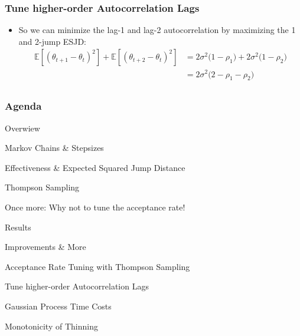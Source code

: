 \begin{frame}[c]
    \frametitle{Tune higher-order Autocorrelation Lags}
    \begin{itemize}
        \item So we can minimize the lag-1 and lag-2 autocorrelation by maximizing the 1 and 2-jump ESJD:
            \begin{align*}
                \mathbb{E}[(\theta_{t+1} - \theta_t)^2] + \mathbb{E}[(\theta_{t+2} - \theta_t)^2] 
                &= 2\sigma^2\big(1 - \rho_1\big) +  2\sigma^2\big(1 - \rho_2\big)\\
                &= 2\sigma^2\big(2 - \rho_1 - \rho_2\big)\\
            \end{align*}
    \end{itemize}
\end{frame}

\begin{frame}[c]
    \frametitle{Agenda}
    \begin{itemize}
        {\color{lgray}
        \item Overwiew
        }
        \begin{itemize}
            {\color{lgray}
            \item Markov Chains \& Stepsizes
            \item Effectiveness \& Expected Squared Jump Distance 
            \item Thompson Sampling
            \item Once more: Why not to tune the acceptance rate!
            }
        \end{itemize}
        {\color{lgray}
        \item Results
        }
        \item Improvements \& More
        \begin{itemize}
            {\color{lgray}
            \item Acceptance Rate Tuning with Thompson Sampling
            \item Tune higher-order Autocorrelation Lags
            }
            \item Gaussian Process Time Costs
            {\color{lgray}
            \item Monotonicity of Thinning
            }
        \end{itemize}
    \end{itemize}
\end{frame}

